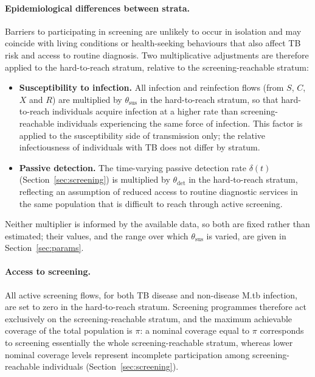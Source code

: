 \documentclass[11pt]{article}
\begin{document}
\paragraph{Epidemiological differences between strata.}
Barriers to participating in screening are unlikely to occur in isolation and may coincide with living conditions or health-seeking behaviours that also affect TB risk and access to routine diagnosis. Two multiplicative adjustments are therefore applied to the hard-to-reach stratum, relative to the screening-reachable stratum:

\begin{itemize}
    \item \textbf{Susceptibility to infection.} All infection and reinfection flows (from \(S\), \(C\), \(X\) and \(R\)) are multiplied by \(\theta_{\mathrm{sus}}\) in the hard-to-reach stratum, so that hard-to-reach individuals acquire infection at a higher rate than screening-reachable individuals experiencing the same force of infection. This factor is applied to the susceptibility side of transmission only; the relative infectiousness of individuals with TB does not differ by stratum.
    \item \textbf{Passive detection.} The time-varying passive detection rate \(\delta(t)\) (Section~\ref{sec:screening}) is multiplied by \(\theta_{\mathrm{det}}\) in the hard-to-reach stratum, reflecting an assumption of reduced access to routine diagnostic services in the same population that is difficult to reach through active screening.
\end{itemize}

\noindent Neither multiplier is informed by the available data, so both are fixed rather than estimated; their values, and the range over which \(\theta_{\mathrm{sus}}\) is varied, are given in Section~\ref{sec:params}.

\paragraph{Access to screening.}
All active screening flows, for both TB disease and non-disease M.tb infection, are set to zero in the hard-to-reach stratum. Screening programmes therefore act exclusively on the screening-reachable stratum, and the maximum achievable coverage of the total population is \(\pi\): a nominal coverage equal to \(\pi\) corresponds to screening essentially the whole screening-reachable stratum, whereas lower nominal coverage levels represent incomplete participation among screening-reachable individuals (Section~\ref{sec:screening}).
\end{document}
